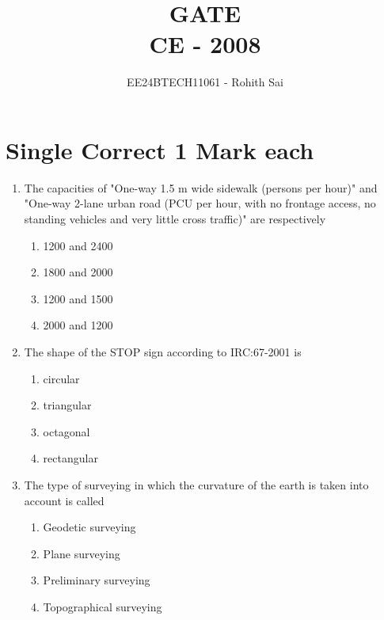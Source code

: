 \documentclass[journal]{IEEEtran}
\begin{document}

\vspace{3cm}

\title{GATE\\CE - 2008}
\author{EE24BTECH11061 - Rohith Sai}
\maketitle

\renewcommand{\thefigure}{\theenumi}
\renewcommand{\thetable}{\theenumi}

\section*{Single Correct 1 Mark each}
\begin{enumerate}
\item The capacities of "One-way 1.5 m wide sidewalk (persons per hour)" and "One-way 2-lane urban road (PCU per hour, with no frontage access, no standing vehicles and very little cross traffic)" are respectively
\begin{multicols}{2}
    \begin{enumerate}
        \item 1200 and 2400
        \item 1800 and 2000
        \item 1200 and 1500
        \item 2000 and 1200
    \end{enumerate}
\end{multicols}

\item The shape of the STOP sign according to IRC:67-2001 is
\begin{multicols}{2}
    \begin{enumerate}
        \item circular
        \item triangular
        \item octagonal 
        \item rectangular
    \end{enumerate}
\end{multicols}

\item The type of surveying in which the curvature of the earth is taken into account is called
\begin{multicols}{2}
    \begin{enumerate}
        \item Geodetic surveying
        \item Plane surveying
        \item Preliminary surveying
        \item Topographical surveying
    \end{enumerate}
\end{multicols}


\end{enumerate}
\end{document}
